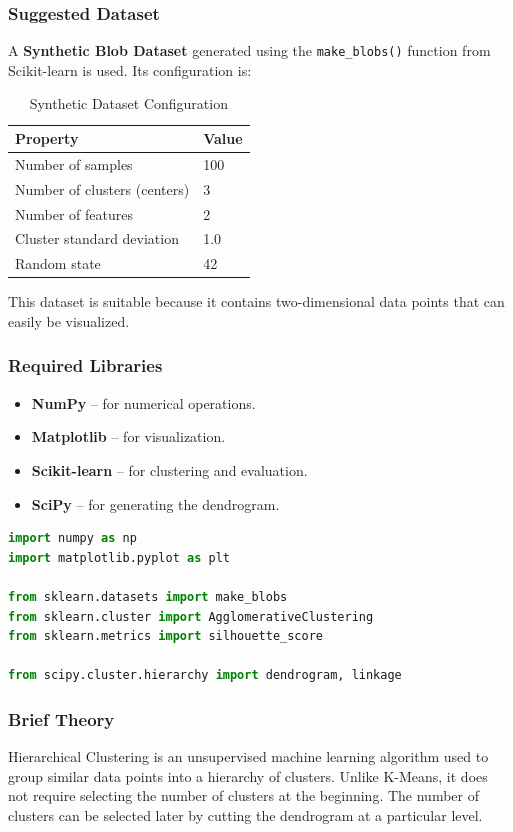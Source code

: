 \documentclass[a4paper,11pt]{article}
\begin{document}
\subsubsection{Suggested Dataset}
A \textbf{Synthetic Blob Dataset} generated using the \texttt{make\_blobs()} function from Scikit-learn is used. Its configuration is:

\begin{table}[H]
\centering
\caption{Synthetic Dataset Configuration}
\begin{tabular}{ll}
\toprule
\textbf{Property} & \textbf{Value} \\
\midrule
Number of samples            & 100 \\
Number of clusters (centers) & 3 \\
Number of features           & 2 \\
Cluster standard deviation   & 1.0 \\
Random state                 & 42 \\
\bottomrule
\end{tabular}
\end{table}

This dataset is suitable because it contains two-dimensional data points that can easily be visualized.

\subsubsection{Required Libraries}
\begin{itemize}
    \item \textbf{NumPy} -- for numerical operations.
    \item \textbf{Matplotlib} -- for visualization.
    \item \textbf{Scikit-learn} -- for clustering and evaluation.
    \item \textbf{SciPy} -- for generating the dendrogram.
\end{itemize}

\begin{lstlisting}[language=Python, caption={Required Imports}]
import numpy as np
import matplotlib.pyplot as plt

from sklearn.datasets import make_blobs
from sklearn.cluster import AgglomerativeClustering
from sklearn.metrics import silhouette_score

from scipy.cluster.hierarchy import dendrogram, linkage
\end{lstlisting}

\subsubsection{Brief Theory}
Hierarchical Clustering is an unsupervised machine learning algorithm used to group similar data points into a hierarchy of clusters. Unlike K-Means, it does not require selecting the number of clusters at the beginning. The number of clusters can be selected later by cutting the dendrogram at a particular level.
\end{document}
